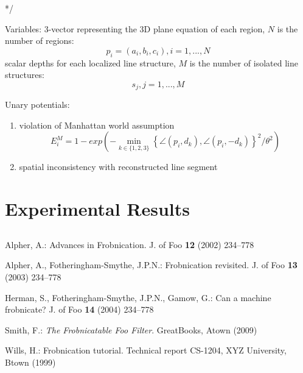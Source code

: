 \documentclass[runningheads]{llncs}
\begin{document}
*/

Variables:
3-vector representing the 3D plane equation of each region, $N$ is the number of regions:
		\[p_i = (a_i, b_i, c_i), i = 1, ..., N\]
scalar depths for each localized line structure, $M$ is the number of isolated line structures:
		\[s_j, j = 1, ..., M\]

Unary potentials:
\begin{enumerate}
\item violation of Manhattan world assumption
\[
	E^M_i = 1-exp\left( - \min_{k \in \{1,2,3\}} \left\{ \angle(p_i, d_k), \angle(p_i, -d_k) \right\} ^2/\theta^2\right)
\]

\item spatial inconsistency with reconstructed line segment $$


\end{enumerate}


\section{Experimental Results}

\subsection {}





\begin{thebibliography}{1}

Alpher, A.:
Advances in Frobnication.
J. of Foo
\textbf{12} (2002)  234--778

Alpher, A., Fotheringham-Smythe, J.P.N.:
Frobnication revisited.
J. of Foo
\textbf{13} (2003)  234--778

Herman, S., Fotheringham-Smythe, J.P.N., Gamow, G.:
Can a machine frobnicate?
J. of Foo
\textbf{14} (2004)  234--778

Smith, F.:
{\it The Frobnicatable Foo Filter}.
GreatBooks, Atown (2009)

Wills, H.:
Frobnication tutorial.
Technical report CS-1204, XYZ University, Btown (1999)

\end{thebibliography}

\end{document}
